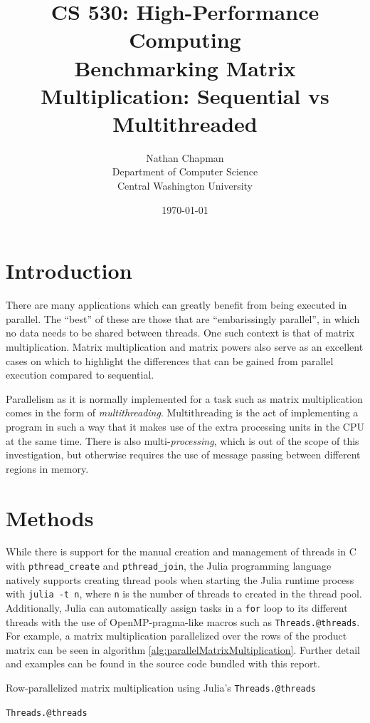 \documentclass{article}
\title{\Large \vspace{-0.5in} CS 530: High-Performance Computing \\ Benchmarking Matrix Multiplication: Sequential vs Multithreaded \vspace{-0.25in}}
\author{Nathan Chapman \vspace{-0.05in} \\ \normalsize Department of Computer Science \vspace{-0.15in} \\ \normalsize Central Washington University}
\date{\normalsize \vspace{-0.15in}\today}
\begin{document}
\maketitle
\tableofcontents

\section{Introduction}

    There are many applications which can greatly benefit from being executed in parallel.  The ``best'' of these are those that are ``embarissingly parallel'', in which no data needs to be shared between threads.  One such context is that of matrix multiplication.  Matrix multiplication and matrix powers also serve as an excellent cases on which to highlight the differences that can be gained from parallel execution compared to sequential.

    Parallelism as it is normally implemented for a task such as matrix multiplication comes in the form of \emph{multithreading}.  Multithreading is the act of implementing a program in such a way that it makes use of the extra processing units in the CPU at the same time.  There is also multi-\emph{processing}, which is out of the scope of this investigation, but otherwise requires the use of message passing between different regions in memory.

\section{Methods}

    While there is support for the manual creation and management of threads in C with \verb|pthread_create| and \verb|pthread_join|, the Julia programming language natively supports creating thread pools when starting the Julia runtime process with \verb|julia -t n|, where \verb|n| is the number of threads to created in the thread pool.  Additionally, Julia can automatically assign tasks in a \verb|for| loop to its different threads with the use of OpenMP-pragma-like macros such as \verb|Threads.@threads|.  For example, a matrix multiplication parallelized over the rows of the product matrix can be seen in algorithm \ref{alg:parallelMatrixMultiplication}.  Further detail and examples can be found in the source code bundled with this report.

    \begin{algorithm}[h]
        \caption{Row-parallelized matrix multiplication using Julia's \texttt{Threads.@threads}}
        \texttt{Threads.@threads} 
        \label{alg:parallelMatrixMultiplication}
    \end{algorithm}
\end{document}
